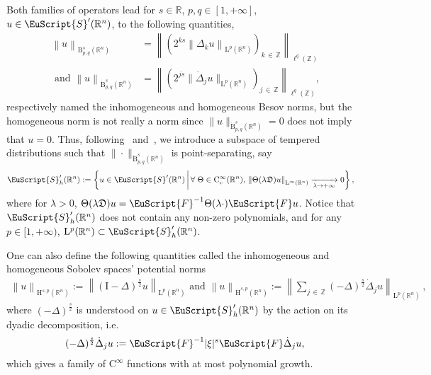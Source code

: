 \documentclass[AHL,Unicode,longabstracts,published]{cedram}
\newcommand{\bbR}{\mathbb{R}}
\newcommand{\bbZ}{\mathbb{Z}}
\newcommand{\rmH}{\mathrm{H}}%
\newcommand{\rmB}{\mathrm{B}}
\newcommand{\rmL}{\mathrm{L}}
\newcommand{\rmC}{\mathrm{C}}
\newcommand{\rmI}{\mathrm{I}}
\newcommand{\fkD}{\mathfrak{D}}
\newcommand{\eus}{\EuScript}
\let\oldforall\forall
\renewcommand*{\forall}{\mathrel{\oldforall}}
\begin{document}
Both families of operators lead for $s\in\bbR$, $p,q\in[1,+\infty]$, $u\in \eus{S}'(\bbR^n)$, to the following quantities,
\begin{align*}
\left\| u \right\|_{\rmB^{s}_{p,q}(\bbR^n)} &= \left\|\left(2^{ks}\left\| {\Delta}_k u \right\|_{\rmL^{p}(\bbR^n)}\right)_{k\,\in\,\bbZ}\right\|_{\ell^{q}(\bbZ)}\\
\text{ and }
\left\| u \right\|_{\dot{\rmB}^{s}_{p,q}(\bbR^n)} &= \left\|\left(2^{js}\| \dot{\Delta}_j u \|_{\rmL^{p}(\bbR^n)}\right)_{j\,\in\,\bbZ}\right\|_{\ell^{q}(\bbZ)}\text{,}
\end{align*}
respectively named the inhomogeneous and homogeneous Besov norms, but the homogeneous norm is not really a norm since $\| u \|_{\dot{\rmB}^{s}_{p,q}(\bbR^n)}=0$ does not imply that $u=0$. Thus, following~\cite[Chapter~2]{bookBahouriCheminDanchin} and~\cite[Chapter~3]{DanchinHieberMuchaTolk2020}, we introduce a subspace of tempered distributions such that $\| \cdot \|_{\dot{\rmB}^{s}_{p,q}(\bbR^n)}$ is point-separating, say
\begin{align*}
\eus{S}'_h(\bbR^n) &:= \left\{ u\in \eus{S}'(\bbR^n)\,\middle|\,\forall \Theta \in \rmC _c^\infty(\bbR^n),\, \left\| \Theta(\lambda \fkD) u \right\|_{\rmL^\infty(\bbR^n)} \xrightarrow[\lambda\rightarrow+\infty]{} 0\right\}\text{,}
\end{align*}
where for $\lambda>0$, $\Theta(\lambda \fkD )u = \eus{F}^{-1}{\Theta}(\lambda\cdot)\eus{F}u$. Notice that $\eus{S}'_h(\bbR^n)$ does not contain any non-zero polynomials, and for any $p\in[1,+\infty)$, $\rmL^p(\bbR^n)\subset\eus{S}'_h(\bbR^n)$.


One can also define the following quantities called the inhomogeneous and homogeneous Sobolev spaces' potential norms
\begin{align*}
\left\| {u} \right\|_{\rmH^{s,p}(\bbR^n)}:= \left\|{(\rmI -\Delta)^\frac{s}{2} u} \right\|_{\rmL^{p}(\bbR^n)}\text{ and } \left\| {u} \right\|_{\dot{\rmH}^{s,p}(\bbR^n)}:= \left\| \sum_{j\,\in\,\bbZ} (-\Delta)^\frac{s}{2}\dot{\Delta}_{j} u \right\|_{{\rmL}^{p}(\bbR^n)}\,,
\end{align*}
where $(-\Delta)^\frac{s}{2}$ is understood on $u\in \eus{S}'_h(\bbR^n)$ by the action on its dyadic decomposition, i.e.
\begin{align*}
(-\Delta)^\frac{s}{2}\dot{\Delta}_j u:= \eus{F}^{-1}|\xi|^s\eus{F}\dot{\Delta}_j u\text{,}
\end{align*}
which gives a family of $\rmC ^\infty$ functions with at most polynomial growth.
\end{document}
